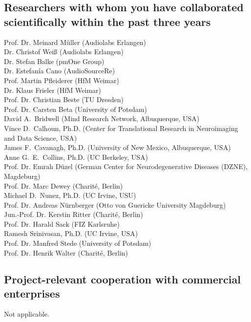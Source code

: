 \documentclass[11pt]{article}
\begin{document}
\subsection{Researchers with whom you have collaborated scientifically within the past three years}
Prof. Dr. Meinard Müller (Audiolabs Erlangen) \\ 
Dr. Christof Weiß (Audiolabs Erlangen) \\
Dr. Stefan Balke (pmOne Group) \\
Dr. Estefanía Cano (AudioSourceRe) \\
Prof. Martin Pfleiderer (HfM Weimar) \\
Dr. Klaus Frieler (HfM Weimar) \\
Prof. Dr. Christian Beste (TU Dresden)\\
Prof. Dr. Carsten Beta (University of Potsdam)\\
David A.~Bridwell (Mind Research Network, Albuquerque, USA)\\
Vince D.~Calhoun, Ph.D. (Center for Translational Research in Neuroimaging and Data Science, USA)\\
James F.~Cavanagh, Ph.D. (University of New Mexico, Albuquerque, USA)\\
Anne G.~E.~Collins, Ph.D. (UC Berkeley, USA)\\
Prof. Dr. Emrah Düzel (German Center for Neurodegenerative Diseases (DZNE), Magdeburg)\\
Prof. Dr. Marc Dewey (Charité, Berlin)\\
Michael D.~Nunez, Ph.D. (UC Irvine, USU)\\
Prof. Dr. Andreas Nürnberger (Otto von Guericke University Magdeburg)\\
Jun.-Prof. Dr. Kerstin Ritter (Charité, Berlin)\\
Prof. Dr. Harald Sack (FIZ Karlsruhe) \\
Ramesh Srinivasan, Ph.D. (UC Irvine, USA)\\
Prof. Dr. Manfred Stede (University of Potsdam)\\
Prof. Dr. Henrik Walter (Charité, Berlin)\\
%

\subsection{Project-relevant cooperation with commercial enterprises}
Not applicable.
\vspace{-.3cm}
\end{document}
